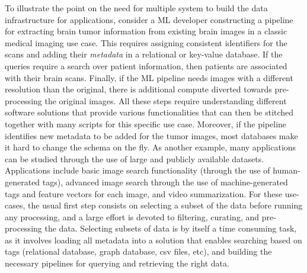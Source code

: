To illustrate the point on the need for multiple system to build the data
infrastructure for applications,
consider a ML developer constructing a pipeline for extracting
brain tumor information from existing brain images in a classic medical
imaging use case.
This requires assigning consistent identifiers for the scans and adding their
\textit{metadata} in a relational or key-value database\cite{kumar2017data}.
If the queries require a search over patient information,
then patients are associated with their brain scans.
Finally, if the ML pipeline needs images with a different resolution
than the original, there is additional compute
diverted towards pre-processing the original images.
All these steps require understanding different software
solutions that provide various functionalities that can then be stitched
together with many scripts for this specific use case.
Moreover, if the pipeline identifies new metadata to be added for
the tumor images, most databases make it hard to change the schema on the fly.
As another example, many applications can be studied through the use of large
and publicly available datasets.
Applications include basic image search functionality (through the use
of human-generated tags), advanced image search through the use of
machine-generated tags and feature vectors\cite{imagesearch, qin2020similarity}
for each image, and video summarization.
For these use-cases, the usual first step consists on selecting a
subset of the data before running any processing, and a large effort
is devoted to filtering, curating, and pre-processing the data.
Selecting subsets of data is by itself a time consuming task,
as it involves loading all metadata into a solution that enables searching
based on tags (relational database, graph database, csv files, etc), and
building the necessary pipelines for querying and retrieving the right data.

